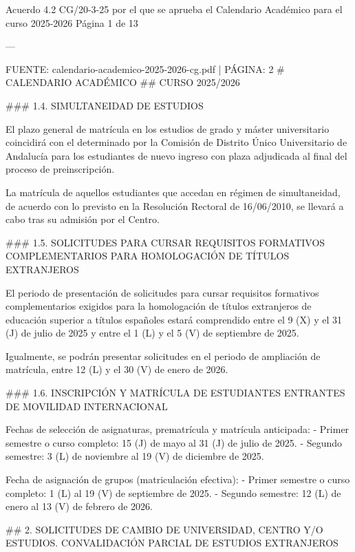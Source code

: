 \documentclass{article}
\begin{document}
\begin{itemize}
\begin{itemize}
\begin{scriptsize}
                  Acuerdo 4.2 CG/20-3-25 por el que se aprueba el Calendario Académico para el curso 2025-2026  Página 1 de 13

                  ---

                  FUENTE: calendario-academico-2025-2026-cg.pdf | PÁGINA: 2
                  \# CALENDARIO ACADÉMICO
                  \#\# CURSO 2025/2026

                  \#\#\# 1.4. SIMULTANEIDAD DE ESTUDIOS

                  El plazo general de matrícula en los estudios de grado y máster universitario coincidirá con el determinado por la Comisión de Distrito Único Universitario de Andalucía para los estudiantes de nuevo ingreso con plaza adjudicada al final del proceso de preinscripción.

                  La matrícula de aquellos estudiantes que accedan en régimen de simultaneidad, de acuerdo con lo previsto en la Resolución Rectoral de 16/06/2010, se llevará a cabo tras su admisión por el Centro.

                  \#\#\# 1.5. SOLICITUDES PARA CURSAR REQUISITOS FORMATIVOS COMPLEMENTARIOS PARA HOMOLOGACIÓN DE TÍTULOS EXTRANJEROS

                  El periodo de presentación de solicitudes para cursar requisitos formativos complementarios exigidos para la homologación de títulos extranjeros de educación superior a títulos españoles estará comprendido entre el 9 (X) y el 31 (J) de julio de 2025 y entre el 1 (L) y el 5 (V) de septiembre de 2025.

                  Igualmente, se podrán presentar solicitudes en el periodo de ampliación de matrícula, entre 12 (L) y el 30 (V) de enero de 2026.

                  \#\#\# 1.6. INSCRIPCIÓN Y MATRÍCULA DE ESTUDIANTES ENTRANTES DE MOVILIDAD INTERNACIONAL

                  Fechas de selección de asignaturas, prematrícula y matrícula anticipada:
                  - Primer semestre o curso completo: 15 (J) de mayo al 31 (J) de julio de 2025.
                  - Segundo semestre: 3 (L) de noviembre al 19 (V) de diciembre de 2025.

                  Fecha de asignación de grupos (matriculación efectiva):
                  - Primer semestre o curso completo: 1 (L) al 19 (V) de septiembre de 2025.
                  - Segundo semestre: 12 (L) de enero al 13 (V) de febrero de 2026.

                  \#\# 2. SOLICITUDES DE CAMBIO DE UNIVERSIDAD, CENTRO Y/O ESTUDIOS. CONVALIDACIÓN PARCIAL DE ESTUDIOS EXTRANJEROS


\end{scriptsize}
\end{itemize}
\end{itemize}
\end{document}
